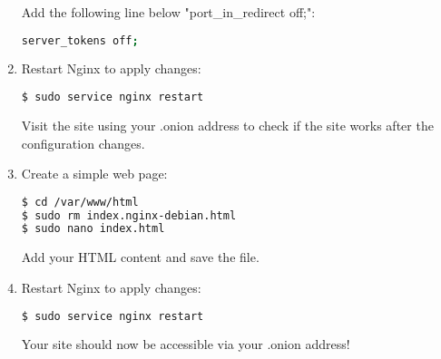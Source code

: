 \begin{enumerate}
Add the following line below "port\_in\_redirect off;":
\begin{lstlisting}[language=bash, breaklines=true, breakatwhitespace=true, columns=fullflexible]
server_tokens off;
\end{lstlisting}

\item Restart Nginx to apply changes:
\begin{lstlisting}[language=bash, breaklines=true, breakatwhitespace=true, columns=fullflexible]
$ sudo service nginx restart
\end{lstlisting}
Visit the site using your .onion address to check if the site works after the configuration changes.

\item Create a simple web page:
\begin{lstlisting}[language=bash, breaklines=true, breakatwhitespace=true, columns=fullflexible]
$ cd /var/www/html
$ sudo rm index.nginx-debian.html
$ sudo nano index.html
\end{lstlisting}
Add your HTML content and save the file.

\item Restart Nginx to apply changes:
\begin{lstlisting}[language=bash, breaklines=true, breakatwhitespace=true, columns=fullflexible]
$ sudo service nginx restart
\end{lstlisting}
Your site should now be accessible via your .onion address!
\end{enumerate}
